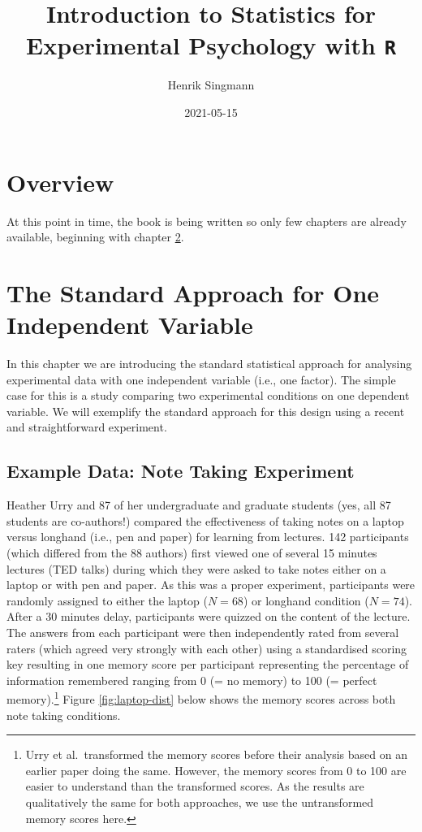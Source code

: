 \documentclass[
]{book}
\title{Introduction to Statistics for Experimental Psychology with \texttt{R}}
\author{Henrik Singmann}
\date{2021-05-15}
\begin{document}
\maketitle

{
\setcounter{tocdepth}{1}
\tableofcontents
}
\hypertarget{overview}{%
\chapter{Overview}\label{overview}}

At this point in time, the book is being written so only few chapters are already available, beginning with chapter \ref{standard1}.

\hypertarget{standard1}{%
\chapter{The Standard Approach for One Independent Variable}\label{standard1}}

In this chapter we are introducing the standard statistical approach for analysing experimental data with one independent variable (i.e., one factor). The simple case for this is a study comparing two experimental conditions on one dependent variable. We will exemplify the standard approach for this design using a recent and straightforward experiment.

\hypertarget{ex:urry}{%
\section{Example Data: Note Taking Experiment}\label{ex:urry}}

Heather Urry and 87 of her undergraduate and graduate students \citep{urry2021} (yes, all 87 students are co-authors!) compared the effectiveness of taking notes on a laptop versus longhand (i.e., pen and paper) for learning from lectures. 142 participants (which differed from the 88 authors) first viewed one of several 15 minutes lectures (TED talks) during which they were asked to take notes either on a laptop or with pen and paper. As this was a proper experiment, participants were randomly assigned to either the laptop (\(N = 68\)) or longhand condition (\(N = 74\)). After a 30 minutes delay, participants were quizzed on the content of the lecture. The answers from each participant were then independently rated from several raters (which agreed very strongly with each other) using a standardised scoring key resulting in one memory score per participant representing the percentage of information remembered ranging from 0 (= no memory) to 100 (= perfect memory).\footnote{Urry et al.~transformed the memory scores before their analysis based on an earlier paper doing the same. However, the memory scores from 0 to 100 are easier to understand than the transformed scores. As the results are qualitatively the same for both approaches, we use the untransformed memory scores here.} Figure \ref{fig:laptop-dist} below shows the memory scores across both note taking conditions.
\end{document}

